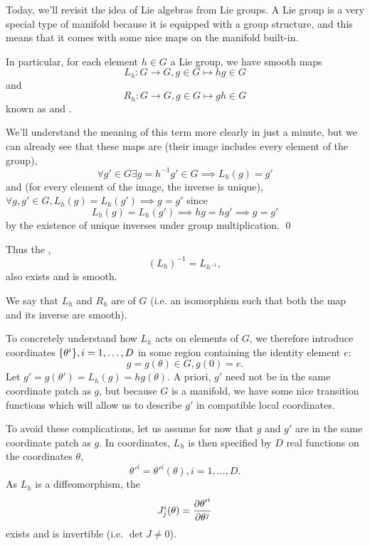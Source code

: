 Today, we'll revisit the idea of Lie algebras from Lie groups. A Lie group is a very special type of manifold because it is equipped with a group structure, and this means that it comes with some nice maps on the manifold built-in.
\begin{defn}
In particular, for each element $h\in G$ a Lie group, we have smooth maps
$$L_h:G\to G, g\in G\mapsto hg \in G$$
and
$$R_h:G\to G, g\in G \mapsto gh \in G$$
known as  and .
\end{defn}
We'll understand the meaning of this term more clearly in just a minute, but we can already see that these maps are  (their image includes every element of the group),
$$\forall g'\in G \exists g= h^{-1}g'\in G \implies L_h(g)=g'$$
and  (for every element of the image, the inverse is unique),
$\forall g, g'\in G, L_h(g)=L_h(g') \implies g=g'$ since
$$L_h(g)=L_h(g')\implies hg = hg' \implies g=g'$$ by the existence of unique inverses under group multiplication. \qed

Thus the ,
$$(L_h)^{-1}=L_{h^{-1}},$$
also exists and is smooth. 
\begin{defn}
We say that $L_h$ and $R_h$ are  of $G$ (i.e. an isomorphism such that both the map and its inverse are smooth).
\end{defn}

To concretely understand how $L_h$ acts on elements of $G$, we therefore introduce coordinates $\set{\theta^i},i=1,\ldots,D$ in some region containing the identity element $e$:
$$g=g(\theta)\in G, g(0)=e.$$
Let $g'=g(\theta')=L_h(g)=h g(\theta).$
A priori, $g'$ need not be in the same coordinate patch as $g$, but because $G$ is a manifold, we have some nice transition functions which will allow us to describe $g'$ in compatible local coordinates. 

To avoid these complications, let us assume for now that $g$ and $g'$ are in the same coordinate patch as $g$. In coordinates,  $L_h$ is then specified by $D$ real functions on the coordinates $\theta$,
$${\theta'}^i={\theta'}^i(\theta),i=1,\ldots,D.$$
As $L_h$ is a diffeomorphism, the 
$$J^i_j(\theta)=\P{{\theta'}^i}{\theta^j}$$
exists and is invertible (i.e. $\det J\neq 0$).

